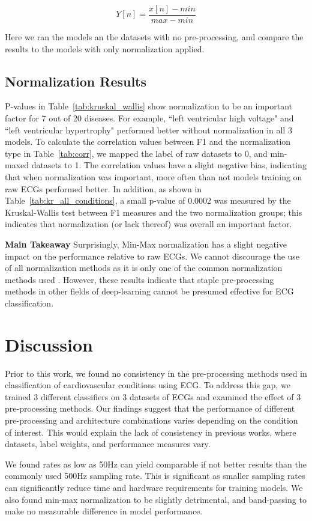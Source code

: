\documentclass[pmlr,twocolumn]{jmlr}%
\begin{document}
\[ Y[n] = \frac{x[n]-min}{max-min} \]

Here we ran the models an the datasets with no pre-processing, and compare the results to the models with only normalization applied.

\subsection{Normalization Results}
P-values in Table~\ref{tab:kruskal_wallis} show normalization to be an important factor for 7 out of 20 diseases. For example, ``left ventricular high voltage" and ``left ventricular hypertrophy" performed better without normalization in all 3 models. To calculate the correlation values between F1 and the normalization type in Table~\ref{tab:corr}, we mapped the label of raw datasets to 0, and min-maxed datasets to 1. The correlation values have a slight negative bias, indicating that when normalization was important, more often than not models training on raw ECGs performed better. In addition, as shown in Table~\ref{tab:kr_all_conditions}, a small p-value of 0.0002 was measured by the Kruskal-Wallis test between F1 measures and the two normalization groups; this indicates that normalization (or lack thereof) was overall an important factor.

\textbf{Main Takeaway} Surprisingly, Min-Max normalization has a slight negative impact on the performance relative to raw ECGs. We cannot discourage the use of all normalization methods as it is only one of the common normalization methods used \citep{uwaechia2021comprehensive}. However, these results indicate that staple pre-processing methods in other fields of deep-learning cannot be presumed effective for ECG classification.

\section{Discussion}
Prior to this work, we found no consistency in the pre-processing methods used in classification of cardiovascular conditions using ECG. To address this gap, we trained 3 different classifiers on 3 datasets of ECGs and examined the effect of 3 pre-processing methods. Our findings suggest that the performance of different pre-processing and architecture combinations varies depending on the condition of interest. This would explain the lack of consistency in previous works, where datasets, label weights, and performance measures vary. 

We found rates as low as 50Hz can yield comparable if not better results than the commonly used 500Hz sampling rate. This is significant as smaller sampling rates can significantly reduce time and hardware requirements for training models. We also found min-max normalization to be slightly detrimental, and band-passing to make no measurable difference in model performance.
\end{document}
